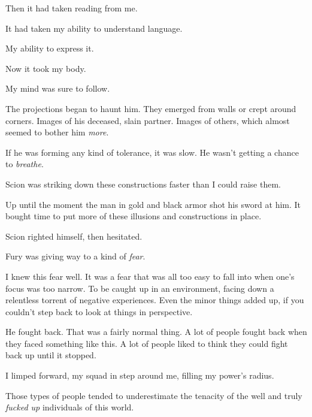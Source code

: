Then it had taken reading from me.



It had taken my ability to understand language.



My ability to express it.



Now it took my body.



My mind was sure to follow.



The projections began to haunt him.  They emerged from walls or crept around corners.  Images of his deceased, slain partner.  Images of others, which almost seemed to bother him \emph{more}.



If he was forming any kind of tolerance, it was slow.  He wasn't getting a chance to \emph{breathe}.



Scion was striking down these constructions faster than I could raise them.



Up until the moment the man in gold and black armor shot his sword at him.  It bought time to put more of these illusions and constructions in place.



Scion righted himself, then hesitated.



Fury was giving way to a kind of \emph{fear}.



I knew this fear well.  It was a fear that was all too easy to fall into when one's focus was too narrow.  To be caught up in an environment, facing down a relentless torrent of negative experiences.  Even the minor things added up, if you couldn't step back to look at things in perspective.



He fought back.  That was a fairly normal thing.  A lot of people fought back when they faced something like this.  A lot of people liked to think they could fight back up until it stopped.



I limped forward, my squad in step around me, filling my power's radius.



Those types of people tended to underestimate the tenacity of the well and truly \emph{fucked up }individuals of this world.



